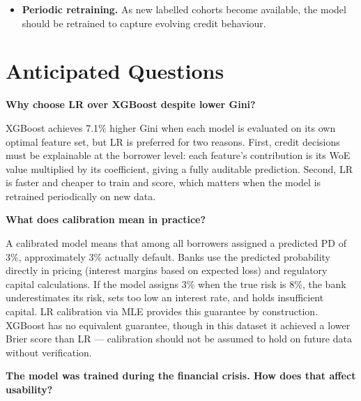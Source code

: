 \documentclass[a4paper,11pt]{article}
\begin{document}
\begin{itemize}[leftmargin=1.5em]
  \item \textbf{Periodic retraining.} As new labelled cohorts become available, the
        model should be retrained to capture evolving credit behaviour.

\end{itemize}

\section{Anticipated Questions}

\textbf{Why choose LR over XGBoost despite lower Gini?}

XGBoost achieves 7.1\% higher Gini when each model is evaluated on its own optimal
feature set, but LR is preferred for two reasons.
First, credit decisions must be explainable at the borrower level: each feature's
contribution is its WoE value multiplied by its coefficient, giving a fully auditable
prediction. Second, LR is faster and cheaper to train and score,
which matters when the model is retrained periodically on new data.

\textbf{What does calibration mean in practice?}

A calibrated model means that among all borrowers assigned a predicted PD of 3\%,
approximately 3\% actually default. Banks use the predicted probability directly in
pricing (interest margins based on expected loss) and regulatory capital calculations.
If the model assigns 3\% when the true risk is 8\%, the bank underestimates its risk,
sets too low an interest rate, and holds insufficient capital. LR calibration via MLE provides this guarantee by construction. XGBoost has no
equivalent guarantee, though in this dataset it achieved a lower Brier score than
LR --- calibration should not be assumed to hold on future data without verification.

\textbf{The model was trained during the financial crisis. How does that affect usability?}
\end{document}
